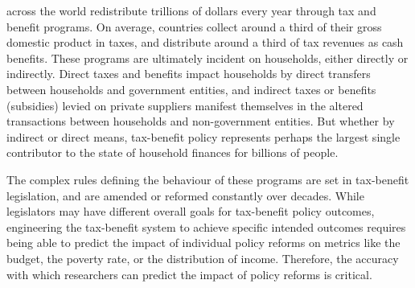 \documentclass[10pt,journal,compsoc]{IEEEtran}
\begin{document}





% 
% 
 across the world redistribute trillions of dollars every year through tax and benefit programs. On average, countries collect around a third of their gross domestic product in taxes, and distribute around a third of tax revenues as cash benefits. These programs are ultimately incident on households, either directly or indirectly. Direct taxes and benefits impact households by direct transfers between households and government entities, and indirect taxes or benefits (subsidies) levied on private suppliers manifest themselves in the altered transactions between households and non-government entities. But whether by indirect or direct means, tax-benefit policy represents perhaps the largest single contributor to the state of household finances for billions of people. 

The complex rules defining the behaviour of these programs are set in tax-benefit legislation, and are amended or reformed constantly over decades. While legislators may have different overall goals for tax-benefit policy outcomes, engineering the tax-benefit system to achieve specific intended outcomes requires being able to predict the impact of individual policy reforms on metrics like the budget, the poverty rate, or the distribution of income. Therefore, the accuracy with which researchers can predict the impact of policy reforms is critical.
\end{document}
